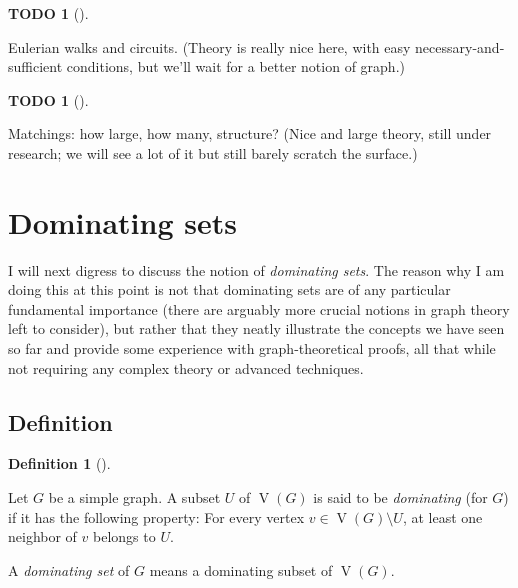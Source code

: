 \documentclass[numbers=enddot,12pt,final,onecolumn,notitlepage]{scrartcl}%
\theoremstyle{definition}
\newtheorem{defi}[theo]{Definition}
\newenvironment{definition}[1][]
{\begin{defi}[#1]\begin{leftbar}}
{\end{leftbar}\end{defi}}
\newtheorem{quest}[theo]{TODO}
\newenvironment{todo}[1][]
{\begin{quest}[#1]\begin{leftbar}}
{\end{leftbar}\end{quest}}
\newcommand{\verts}[1]{\operatorname{V}\left( #1 \right)}
\begin{document}
\begin{todo}
Eulerian walks and circuits.
(Theory is really nice here, with easy necessary-and-sufficient conditions, but we'll wait for a better notion of graph.)
\end{todo}

\begin{todo}
Matchings:
how large, how many, structure? (Nice and large theory, still under research; we will see a lot of it but still barely scratch the surface.)
\end{todo}

\section{\label{sect.dominating}Dominating sets}

I will next digress to discuss the notion of \textit{dominating sets}.
The reason why I am doing this at this point is not that dominating
sets are of any particular fundamental importance (there are arguably
more crucial notions in graph theory left to consider), but rather
that they neatly illustrate the concepts we have seen so far and
provide some experience with graph-theoretical proofs, all that while
not requiring any complex theory or advanced techniques.

\subsection{\label{subsect.dominating.defs}Definition}

\begin{definition} \label{def.dominating}
Let $G$ be a simple graph. A subset $U$ of $\verts{G}$ is said to be
\textit{dominating} (for $G$) if it has the following property: For
every vertex $v \in \verts{G} \setminus U$, at least one neighbor of
$v$ belongs to $U$.

A \textit{dominating set} of $G$ means a dominating subset of
$\verts{G}$.
\end{definition}
\end{document}
